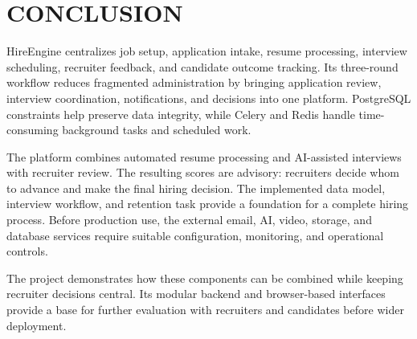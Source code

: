 \chapter{CONCLUSION}
HireEngine centralizes job setup, application intake, resume processing, interview scheduling, recruiter feedback, and candidate outcome tracking. Its three-round workflow reduces fragmented administration by bringing application review, interview coordination, notifications, and decisions into one platform. PostgreSQL constraints help preserve data integrity, while Celery and Redis handle time-consuming background tasks and scheduled work.

The platform combines automated resume processing and AI-assisted interviews with recruiter review. The resulting scores are advisory: recruiters decide whom to advance and make the final hiring decision. The implemented data model, interview workflow, and retention task provide a foundation for a complete hiring process. Before production use, the external email, AI, video, storage, and database services require suitable configuration, monitoring, and operational controls.

The project demonstrates how these components can be combined while keeping recruiter decisions central. Its modular backend and browser-based interfaces provide a base for further evaluation with recruiters and candidates before wider deployment.
%
%
